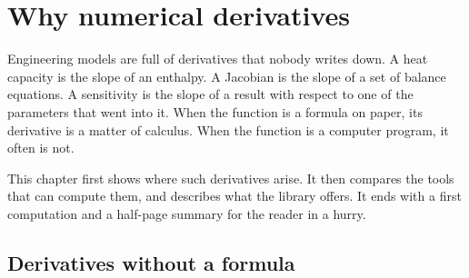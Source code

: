 \chapter{Why numerical derivatives}\label{ch:why}

Engineering models are full of derivatives that nobody writes down. A heat capacity is the slope of an enthalpy. A
Jacobian is the slope of a set of balance equations. A sensitivity is the slope of a result with respect to one of
the parameters that went into it. When the function is a formula on paper, its derivative is a matter of calculus.
When the function is a computer program, it often is not.

This chapter first shows where such derivatives arise. It then compares the tools that can compute them, and
describes what the library \nxx{} offers. It ends with a first computation and a half-page summary for the reader in
a hurry.

\section{Derivatives without a formula}\label{sec:why-without-formula}

